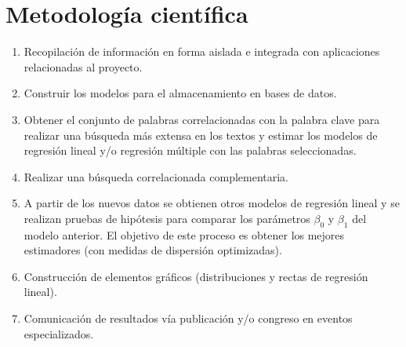 \section {Metodología científica}
\begin{enumerate}
\item Recopilación de información en forma aislada e integrada con aplicaciones relacionadas al proyecto.
\item Construir los modelos para el almacenamiento en bases de datos.
\item Obtener el conjunto de palabras correlacionadas con la palabra clave para realizar una búsqueda más extensa en los textos y estimar los modelos de regresión lineal y/o regresión múltiple con las palabras seleccionadas.
\item Realizar una búsqueda correlacionada complementaria.
\item A partir de los nuevos datos se obtienen otros modelos de regresión lineal y se realizan pruebas de hipótesis para comparar los parámetros $\beta_0$ y $\beta_1$ del modelo anterior. El objetivo de este proceso es obtener los mejores estimadores (con medidas de dispersión optimizadas).
\item Construcción de elementos gráficos (distribuciones y rectas de regresión lineal).
\item Comunicación de resultados vía publicación y/o congreso en eventos especializados.
\end{enumerate}